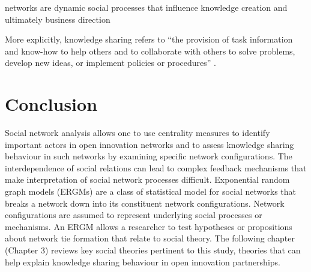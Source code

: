 networks are dynamic social processes that influence knowledge creation and ultimately business direction \citep{sloane and o'reilly 2013}





More explicitly, knowledge sharing refers to \enquote{the provision of task information and know-how to help others and to collaborate with others to solve problems, develop new ideas, or implement policies or procedures} \citep{wang2010knowledge}. 


\section{Conclusion}

Social network analysis allows one to use centrality measures to identify important actors in open innovation networks and to assess knowledge sharing behaviour in such networks by examining specific network configurations. The interdependence of social relations can lead to complex feedback mechanisms that make interpretation of social network processes difficult. Exponential random graph models (ERGMs) are a class of statistical model for social networks that breaks a network down into its constituent network configurations. Network configurations are assumed to represent underlying social processes or mechanisms. An ERGM allows a researcher to test hypotheses or propositions about network tie formation that relate to social theory. The following chapter (Chapter 3) reviews key social theories pertinent to this study, theories that can help explain knowledge sharing behaviour in open innovation partnerships. 